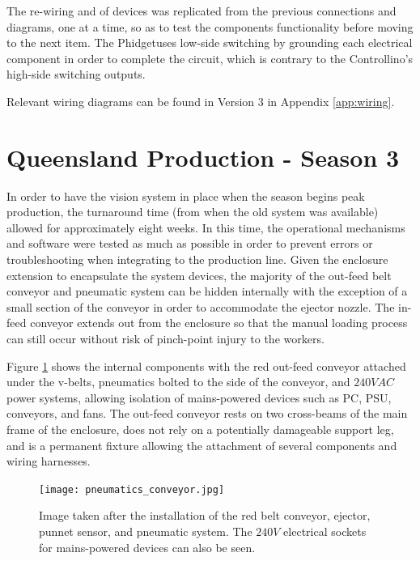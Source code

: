 \documentclass[fleqn,twoside,12pt]{report}
\begin{document}
The re-wiring and of devices was replicated from the previous connections and diagrams, one at a time, so as to test the components functionality before moving to the next item. The Phidget\texttrademark uses low-side switching by grounding each electrical component in order to complete the circuit, which is contrary to the Controllino\texttrademark's high-side switching outputs. 

Relevant wiring diagrams can be found in Version 3 in Appendix \ref{app:wiring}.


\section{Queensland Production - Season 3}


In order to have the vision system in place when the season begins peak production, the turnaround time (from when the old system was available) allowed for approximately eight weeks. In this time, the operational mechanisms and software were tested as much as possible in order to prevent errors or troubleshooting when integrating to the production line. Given the enclosure extension to encapsulate the system devices, the majority of the  out-feed belt conveyor and pneumatic system can be hidden internally with the exception of a small section of the conveyor in order to accommodate the ejector nozzle. The in-feed conveyor extends out from the enclosure so that the manual loading process can still occur without risk of pinch-point injury to the workers.

Figure \ref{fig:pneumatics_conveyor} shows the internal components with the red out-feed conveyor attached under the v-belts, pneumatics bolted to the side of the conveyor, and $240VAC$ power systems, allowing isolation of mains-powered devices such as PC, PSU, conveyors, and fans. The out-feed conveyor rests on two cross-beams of the main frame of the enclosure, does not rely on a potentially damageable support leg, and is a permanent fixture allowing the attachment of several components and wiring harnesses. 


\begin{figure}
	\begin{center}
		\texttt{[image: pneumatics\_conveyor.jpg]}
	\end{center}
	\caption{Image taken after the installation of the red belt conveyor, ejector, punnet sensor, and pneumatic system. The $240V$ electrical sockets for mains-powered devices can also be seen.}
	\label{fig:pneumatics_conveyor}
\end{figure} 
\end{document}
